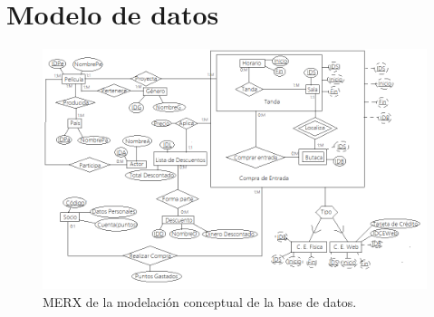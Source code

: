 \chapter{Modelo de datos}\label{ch:model}

\begin{figure}[h]
    \begin{center}
        \includegraphics[width=16.0cm]{./chapters/img/is.png}
    \end{center}

    \caption{MERX de la modelación conceptual de la base de datos.}
\end{figure}